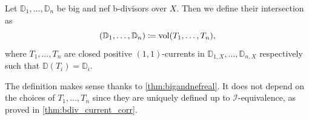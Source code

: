 \begin{definition}\label{def:DF_ext2}
    Let $\mathbb{D}_1,\ldots,\mathbb{D}_n$ be big and nef b-divisors over $X$. Then we define their intersection as
    \[
    \left( \mathbb{D}_1,\ldots,\mathbb{D}_n \right)\coloneqq \operatorname{vol} (T_1,\ldots,T_n),
    \]
    where $T_1,\ldots,T_n$ are closed positive $(1,1)$-currents in $\mathbb{D}_{1,X},\ldots,\mathbb{D}_{n,X}$ respectively such that $\mathbb{D}(T_i)=\mathbb{D}_{i}$.
\end{definition}
The definition makes sense thanks to \cref{thm:bigandnefreal}. It does not depend on the choices of $T_1,\ldots,T_n$ since they are uniquely defined up to $\mathcal{I}$-equivalence, as proved in \cref{thm:bdiv_current_corr}.



